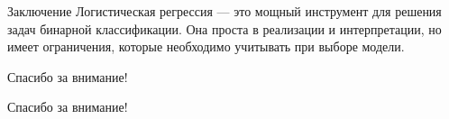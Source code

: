 \documentclass[aspectratio=169, handout]{beamer}
\begin{document}
	\begin{frame}{Заключение}
		Логистическая регрессия — это мощный инструмент для решения задач бинарной классификации. Она проста в реализации и интерпретации, но имеет ограничения, которые необходимо учитывать при выборе модели.
	\end{frame}
	
	\begin{frame}{Спасибо за внимание!}
		\begin{center}
			\Huge Спасибо за внимание!
		\end{center}
	\end{frame}
	
\end{document}

